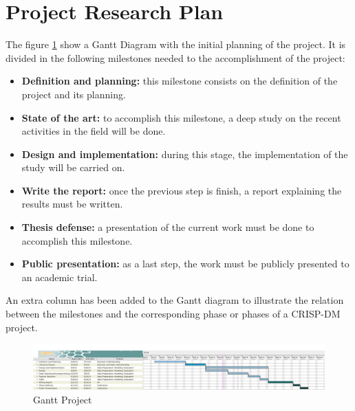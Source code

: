\onehalfspacing
\section{Project Research Plan}

The figure \ref{fig:gantt} show a Gantt Diagram with the initial planning of the project.
It is divided in the following milestones needed to the accomplishment of the project:

\begin{itemize}
    \item \textbf{Definition and planning:} this milestone consists on the definition of the project and its planning.
    \item \textbf{State of the art:} to accomplish this milestone, a deep study on the recent activities in the field will be done.
    \item \textbf{Design and implementation:} during this stage, the implementation of the study will be carried on.
    \item \textbf{Write the report:} once the previous step is finish, a report explaining the results must be written.
    \item \textbf{Thesis defense:} a presentation of the current work must be done to accomplish this milestone.
    \item \textbf{Public presentation:} as a last step, the work must be publicly presented to an academic trial.
\end{itemize}

An extra column has been added to the Gantt diagram to illustrate the relation between the milestones and the corresponding phase or phases of a CRISP-DM project.

\begin{figure}[h]
    \centering
    \includegraphics[angle=90, width=\textwidth,height=\textheight,keepaspectratio]{../figs/TFM_plan.png}
    \caption{Gantt Project}
    \label{fig:gantt}
\end{figure}